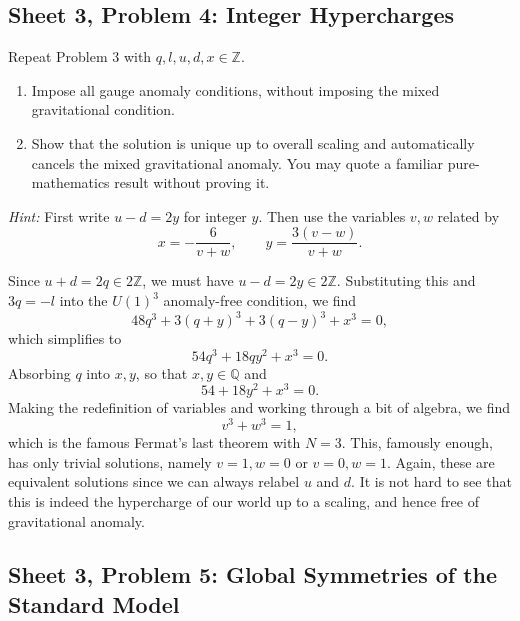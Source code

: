 \subsection{Sheet 3, Problem 4: Integer Hypercharges}

Repeat Problem 3 with $q,l,u,d,x\in\mathbb Z$.
\begin{enumerate}[label=\roman*)]
    \item Impose all gauge anomaly conditions, without imposing the
    mixed gravitational condition.
    \item Show that the solution is unique up to overall scaling and
    automatically cancels the mixed gravitational anomaly. You may
    quote a familiar pure-mathematics result without proving it.
\end{enumerate}
\textit{Hint:} First write $u-d=2y$ for integer $y$. Then use
the variables $v,w$ related by
\begin{equation}
    x=-\frac6{v+w},
    \qquad y=\frac{3(v-w)}{v+w}.
\end{equation}
\begin{solution}
    Since $u+d = 2q \in 2\mathbb{Z}$, we must have $u-d = 2y \in 2\mathbb{Z}$. Substituting this and $3q = -l$ into the $U(1)^3$ anomaly-free condition, we find
    \begin{equation}
        48q^3 +3(q+y)^3+3(q-y)^3 +x^3 = 0,
    \end{equation}
    which simplifies to
    \begin{equation}
        54q^3 +18qy^2 +x^3 = 0.
    \end{equation}
    Absorbing $q$ into $x,y$, so that $x,y \in \mathbb{Q}$ and
    \begin{equation}
        54 +18y^2 +x^3 = 0.
    \end{equation}
    Making the redefinition of variables and working through a bit of algebra, we find
    \begin{equation}
        v^3 +w^3 =1,
    \end{equation}
    which is the famous Fermat's last theorem with $N=3$. This, famously enough, has only trivial solutions, namely $v = 1, w=0$ or $v=0, w=1$. Again, these are equivalent solutions since we can always relabel $u$ and $d$. It is not hard to see that this is indeed the hypercharge of our world up to a scaling, and hence free of gravitational anomaly.
\end{solution}

\subsection{Sheet 3, Problem 5: Global Symmetries of the Standard Model}

